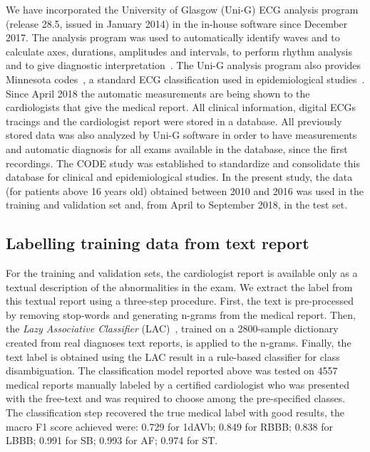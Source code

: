 \documentclass{article}
\begin{document}
We have incorporated the University of Glasgow (Uni-G) ECG analysis program (release 28.5, issued in January 2014) in the in-house software since December 2017. The  analysis program was used to automatically identify waves and to calculate axes, durations, amplitudes and intervals, to perform rhythm analysis and to give diagnostic interpretation~\cite{macfarlane_methodology_1990, macfarlane_university_2005}. The Uni-G analysis program also provides Minnesota codes~\cite{macfarlane_automated_1996}, a standard ECG classification used in epidemiological studies~\cite{prineas_minnesota_2009}. Since April 2018 the automatic measurements are being shown to the cardiologists that give the medical report. All clinical information, digital ECGs tracings and the cardiologist report were stored in a database. All previously stored data was also analyzed by Uni-G software in order to have measurements and automatic diagnosis for all exams available in the database, since the first recordings.  The CODE study was established to standardize and consolidate this database for clinical and epidemiological studies. In the present study, the data (for patients above 16 years old) obtained between 2010 and 2016 was used in the training and validation set and, from April to September 2018, in the test set. 


\subsection{Labelling training data from text report}
\label{sec:labelling}

For the training and validation sets, the cardiologist report is available only as a textual description of the abnormalities in the exam.  We extract the label from this textual report using a three-step procedure. First, the text is pre-processed by removing stop-words and generating n-grams from the medical report. Then, the \textit{Lazy Associative Classifier} (LAC)~\cite{veloso_lazy_2006}, trained on a 2800-sample dictionary created from real diagnoses text reports, is applied to the n-grams. Finally, the text label is obtained using the LAC result in a rule-based classifier for class disambiguation. The classification model reported above was tested on 4557 medical reports manually labeled by a certified cardiologist who was presented with the free-text and was required to choose among the pre-specified classes. The classification step recovered the true medical label with good results,  the macro F1 score achieved were: 0.729 for 1dAVb; 0.849 for RBBB; 0.838 for LBBB; 0.991 for SB; 0.993 for AF; 0.974 for ST.
\end{document}
